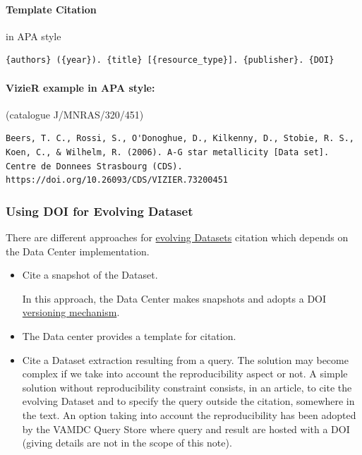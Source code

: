 \documentclass[11pt,a4paper]{ivoa}
\begin{document}
\paragraph{Template Citation } in APA style

\begin{lstlisting}
{authors} ({year}). {title} [{resource_type}]. {publisher}. {DOI}
\end{lstlisting}

\paragraph{VizieR example in APA style:} (catalogue J/MNRAS/320/451)
\begin{lstlisting}
Beers, T. C., Rossi, S., O'Donoghue, D., Kilkenny, D., Stobie, R. S., 
Koen, C., & Wilhelm, R. (2006). A-G star metallicity [Data set].
Centre de Donnees Strasbourg (CDS). https://doi.org/10.26093/CDS/VIZIER.73200451
\end{lstlisting}

\subsubsection{Using DOI for Evolving Dataset}\hypertarget{using-doi-for-evolving-dataset}{}\label{using-doi-for-evolving-dataset}

There are different approaches for \hyperlink{evolving-datasets}{evolving Datasets} citation which depends on the Data Center implementation.

\begin{itemize}
\item  Cite a snapshot of the Dataset. 

In this approach, the Data Center makes snapshots and adopts a DOI \hyperlink{versioning}{versioning mechanism}.

\item The Data center provides a template for citation. %



\item Cite a Dataset extraction resulting from a query. \newline
The solution may become complex if we take into account the reproducibility aspect or not. A simple solution without reproducibility constraint consists, in an article, to cite the evolving Dataset and to specify the query outside the citation, somewhere in the text.\newline
An option taking into account the reproducibility has been adopted by the VAMDC Query Store where query and result are hosted with a DOI (giving details are not in the scope of this note).

\end{itemize}
\end{document}
